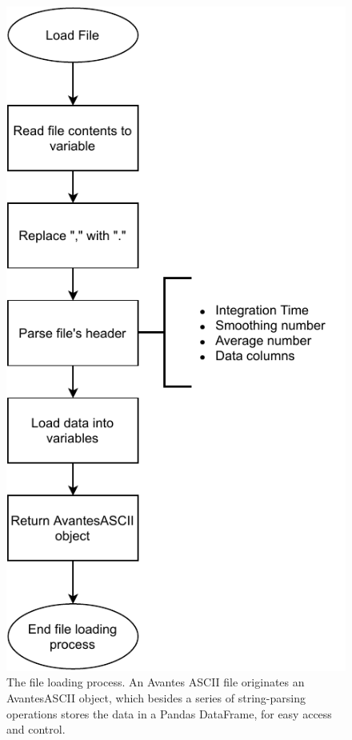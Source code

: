 \begin{figure}[htpb]
    \begin{minipage}{.45\textwidth}
        \centering
        \includegraphics[width=0.7\linewidth]{img/pdf/file_loading.pdf}
        \caption{The file loading process. An Avantes ASCII file originates
        an AvantesASCII object, which besides a series of string-parsing
        operations stores the data in a Pandas DataFrame, for easy access and
        control.}
        \label{fig:avantesASCIIFileLoader}
    \end{minipage}
    \hfill
    \begin{minipage}{.45\textwidth}
        \centering

\end{minipage}
\end{figure}
